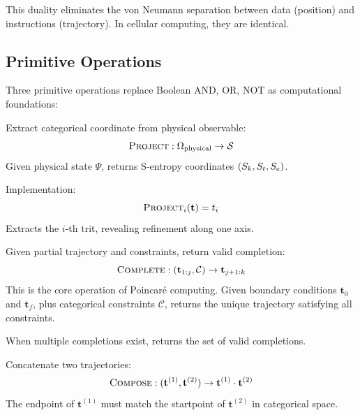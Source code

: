 This duality eliminates the von Neumann separation between data (position) and instructions (trajectory). In cellular computing, they are identical.

\subsection{Primitive Operations}

Three primitive operations replace Boolean AND, OR, NOT as computational foundations:

\begin{definition}
\label{def:project}
Extract categorical coordinate from physical observable:
\begin{equation}
\textsc{Project}: \Omega_{\text{physical}} \to \mathcal{S}
\end{equation}
Given physical state $\Psi$, returns S-entropy coordinates $(S_k, S_t, S_e)$.

Implementation:
\begin{equation}
\textsc{Project}_i(\mathbf{t}) = t_i
\end{equation}
Extracts the $i$-th trit, revealing refinement along one axis.
\end{definition}

\begin{definition}
\label{def:complete}
Given partial trajectory and constraints, return valid completion:
\begin{equation}
\textsc{Complete}: (\mathbf{t}_{1:j}, \mathcal{C}) \to \mathbf{t}_{j+1:k}
\end{equation}
This is the core operation of Poincar\'{e} computing. Given boundary conditions $\mathbf{t}_0$ and $\mathbf{t}_f$, plus categorical constraints $\mathcal{C}$, returns the unique trajectory satisfying all constraints.

When multiple completions exist, returns the set of valid completions.
\end{definition}

\begin{definition}
\label{def:compose}
Concatenate two trajectories:
\begin{equation}
\textsc{Compose}: (\mathbf{t}^{(1)}, \mathbf{t}^{(2)}) \to \mathbf{t}^{(1)} \cdot \mathbf{t}^{(2)}
\end{equation}
The endpoint of $\mathbf{t}^{(1)}$ must match the startpoint of $\mathbf{t}^{(2)}$ in categorical space.
\end{definition}

